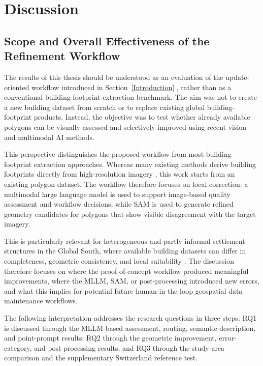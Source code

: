 \chapter{Discussion}
\label{09_diskussion}


\section{Scope and Overall Effectiveness of the Refinement Workflow}

The results of this thesis should be understood as an evaluation of the update-oriented workflow introduced in Section~\ref{Introduction} \citep{Qin_changedetection, Wadembere_GeometryAdjustment}, rather than as a conventional building-footprint extraction benchmark. The aim was not to create a new building dataset from scratch or to replace existing global building-footprint products. Instead, the objective was to test whether already available polygons can be visually assessed and selectively improved using recent vision and multimodal AI methods.

This perspective distinguishes the proposed workflow from most building-footprint extraction approaches. Whereas many existing methods derive building footprints directly from high-resolution imagery \citep{Luo_overviewbuioldingfootprint, rastogi2022automatic}, this work starts from an existing polygon dataset. The workflow therefore focuses on local correction: a multimodal large language model is used to support image-based quality assessment and workflow decisions, while SAM is used to generate refined geometry candidates for polygons that show visible disagreement with the target imagery.

This is particularly relevant for heterogeneous and partly informal settlement structures in the Global South, where available building datasets can differ in completeness, geometric consistency, and local suitability \citep{sirko2021continentalscalebuildingdetectionhigh, CHAMBERLAIN2024102104}. The discussion therefore focuses on where the proof-of-concept workflow produced meaningful improvements, where the MLLM, SAM, or post-processing introduced new errors, and what this implies for potential future human-in-the-loop geospatial data maintenance workflows.

The following interpretation addresses the research questions in three steps: RQ1 is discussed through the MLLM-based assessment, routing, semantic-description, and point-prompt results; RQ2 through the geometric improvement, error-category, and post-processing results; and RQ3 through the study-area comparison and the supplementary Switzerland reference test.

